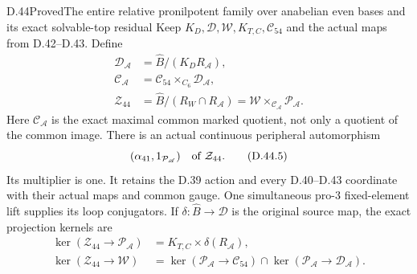 \begin{statement}{D.44}{Proved}{The entire relative pronilpotent family over anabelian even bases and its exact solvable-top residual}
Keep \(K_D,\mathcal D,\mathcal W,K_{T,C},\mathcal C_{54}\)
and the actual maps from D.42--D.43. Define
\[
 \begin{split}
 \mathcal D_{\mathscr A}
       &=\widehat B/(K_D R_{\mathscr A}),\\
 \mathcal C_{\mathscr A}
       &=\mathcal C_{54}\times_{C_6}\mathcal D_{\mathscr A},\\
 \mathcal Z_{44}
       &=\widehat B/(R_W\cap R_{\mathscr A})
         =\mathcal W\times_{\mathcal C_{\mathscr A}}
                              \mathcal P_{\mathscr A}.
 \end{split}                                                   \tag{D.44.4}
\]
Here \(\mathcal C_{\mathscr A}\) is the exact maximal common
marked quotient, not only a quotient of the common image.
There is an actual continuous peripheral automorphism
\[
            (\alpha_{41},1_{\mathcal P_{\mathscr A}})
                   \quad\hbox{of }\mathcal Z_{44}.              \tag{D.44.5}
\]
Its multiplier is one. It retains the D.39 action and every
D.40--D.43 coordinate with their actual maps and common gauge.
One simultaneous pro-\(3\) fixed-element lift supplies its
loop conjugators. If \(\delta:\widehat B\to\mathcal D\)
is the original source map, the exact projection kernels are
\[
 \begin{split}
 \ker(\mathcal Z_{44}\to\mathcal P_{\mathscr A})
       &=K_{T,C}\times\delta(R_{\mathscr A}),\\
 \ker(\mathcal Z_{44}\to\mathcal W)
       &=\ker(\mathcal P_{\mathscr A}\to\mathcal C_{54})
           \cap
         \ker(\mathcal P_{\mathscr A}\to\mathcal D_{\mathscr A}).
 \end{split}                                                   \tag{D.44.6}
\]


\end{statement}
